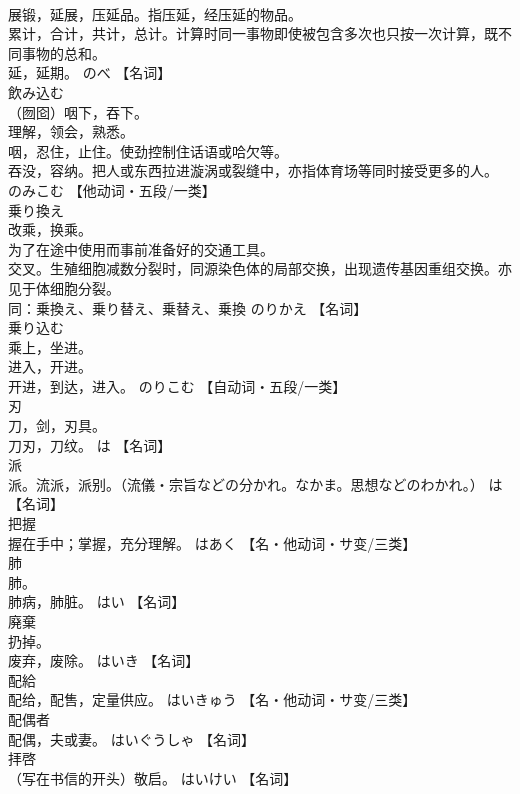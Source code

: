 \documentclass[8pt]{extreport}
\begin{document}
\begin{CJK}{UTF8}{min}
\\	展锻，延展，压延品。指压延，经压延的物品。 
\\	累计，合计，共计，总计。计算时同一事物即使被包含多次也只按一次计算，既不同事物的总和。 
\\	延，延期。	のべ		【名词】
\\	飲み込む	
\\	（囫囵）咽下，吞下。 
\\	理解，领会，熟悉。 
\\	咽，忍住，止住。使劲控制住话语或哈欠等。 
\\	吞没，容纳。把人或东西拉进漩涡或裂缝中，亦指体育场等同时接受更多的人。	のみこむ		【他动词・五段/一类】
\\	乗り換え	
\\	改乘，换乘。 
\\	为了在途中使用而事前准备好的交通工具。 
\\	交叉。生殖细胞减数分裂时，同源染色体的局部交换，出现遗传基因重组交换。亦见于体细胞分裂。 
\\	同：乗換え、乗り替え、乗替え、乗換	のりかえ		【名词】
\\	乗り込む	
\\	乘上，坐进。 
\\	进入，开进。 
\\	开进，到达，进入。	のりこむ		【自动词・五段/一类】
\\	刃	
\\	刀，剑，刃具。 
\\	刀刃，刀纹。	は		【名词】
\\	派	
\\	派。流派，派别。（流儀・宗旨などの分かれ。なかま。思想などのわかれ。）	は		【名词】
\\	把握	
\\	握在手中；掌握，充分理解。	はあく		【名・他动词・サ变/三类】
\\	肺	
\\	肺。 
\\	肺病，肺脏。	はい		【名词】
\\	廃棄	
\\	扔掉。 
\\	废弃，废除。	はいき		【名词】
\\	配給	
\\	配给，配售，定量供应。	はいきゅう		【名・他动词・サ变/三类】
\\	配偶者	
\\	配偶，夫或妻。	はいぐうしゃ		【名词】
\\	拝啓	
\\	（写在书信的开头）敬启。	はいけい		【名词】

\end{CJK}
\end{document}

